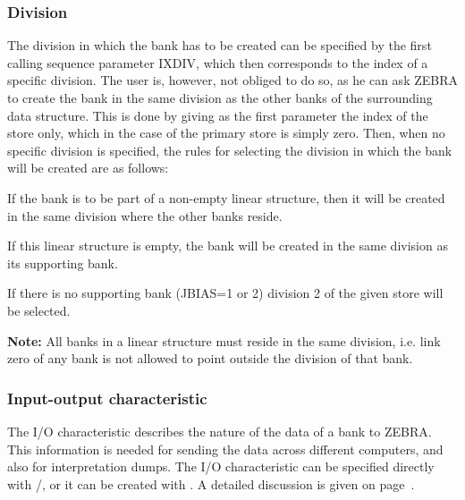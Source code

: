 \subsubsection{Division}
\par The division in which the bank has to be created can be specified by
the first calling sequence parameter IXDIV, which then corresponds
to the index of a specific division.
The user is, however, not obliged to do so, as he can ask
ZEBRA to create the bank in the same division as the other banks of the
surrounding data structure. This is done by giving as the first parameter
the index of the store only, which in the case of the primary store is
simply zero. Then, when no specific division is specified, the
rules for selecting the division in which the bank will be created
are as follows:
\begin{UL}
\item If the bank is to be part of a non-empty linear
structure, then it will be created
in the same division where the other banks reside.
\item
If this linear structure is empty, the bank will be created in the
same division as its supporting bank.
\item
If there is no supporting bank (JBIAS=1 or 2) division 2 of the given
store will be selected.
\end{UL}
\par {\bf Note:}
All banks in a linear structure must reside in the same division, i.e.
link zero of any bank is not allowed to point
outside the division of that bank.
\subsubsection{Input-output characteristic}
\par The I/O characteristic describes the nature of the data of a bank to
ZEBRA. This information is needed for sending the data across
different computers, and also for interpretation dumps. The I/O
characteristic can be specified directly with /,
or it can be created with . A detailed discussion
is given on page~\pageref{SR_MZFORM}.

